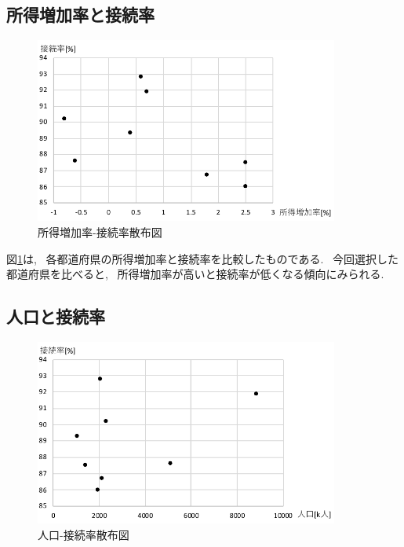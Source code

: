 \documentclass{jsarticle}
\begin{document}
    \subsection{所得増加率と接続率}
        \begin{figure}[ht]
            \begin{center}
                \includegraphics[width=10cm]{syotokuzouka.pdf}
                \caption{所得増加率-接続率散布図}
                \label{fig:所得増加率}
            \end{center}
        \end{figure}

        図\ref{fig:所得増加率}は, ~各都道府県の所得増加率と接続率を比較したものである.
        ~今回選択した都道府県を比べると,
        ~所得増加率が高いと接続率が低くなる傾向にみられる.

    \subsection{人口と接続率}
        \begin{figure}[ht]
            \begin{center}
                \includegraphics[width=10cm]{jinkou.pdf}
                \caption{人口-接続率散布図}
                \label{fig:人口}
            \end{center}
        \end{figure}
\end{document}
